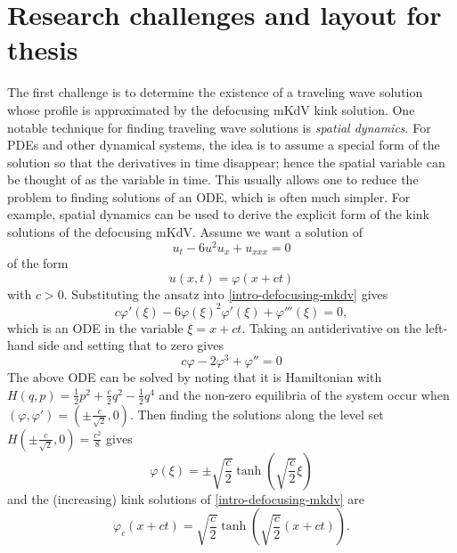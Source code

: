 \section{Research challenges and layout for thesis}

The first challenge is to determine the existence of a traveling wave solution whose profile is approximated by the defocusing mKdV kink solution. One notable technique for finding traveling wave solutions is \emph{spatial dynamics}. For PDEs and other dynamical systems, the idea is to assume a special form of the solution so that the derivatives in time disappear; hence the spatial variable can be thought of as the variable in time. This usually allows one to reduce the problem to finding solutions of an ODE, which is often much simpler. For example, spatial dynamics can be used to derive the explicit form of the kink solutions of the defocusing mKdV. Assume we want a solution of 
\begin{equation}\label{intro-defocusing-mkdv}
	u_t - 6u^2u_x + u_{xxx} = 0
\end{equation}
of the form
\begin{equation*}
	u(x,t) = \varphi(x+ct) 
\end{equation*}
with \(c > 0\). Substituting the ansatz into \cref{intro-defocusing-mkdv} gives
\begin{equation*}
	c \varphi '(\xi) - 6\varphi(\xi)^2 \varphi'(\xi) + \varphi'''(\xi) = 0,
\end{equation*}
which is an ODE in the variable \(\xi=x+ct\). Taking an antiderivative on the left-hand side and setting that to zero gives
\begin{equation*}
	c\varphi  - 2 \varphi^3  + \varphi'' = 0
\end{equation*}
The above ODE can be solved by noting that it is Hamiltonian with \(H(q,p) = \frac 1 2 p^2 + \frac c 2 q^2 - \frac 12 q^4\) and the non-zero equilibria of the system occur when \((\varphi, \varphi') = (\pm \frac c {\sqrt 2}, 0)\). Then finding the solutions along the level set \(H(\pm \frac c {\sqrt 2}, 0) = \frac {c^2} 8\) gives 
\begin{equation*}
	\varphi(\xi) = \pm \sqrt{\frac c  2} \tanh\left( \sqrt{\frac c 2} \xi\right)
\end{equation*}
and the (increasing) kink solutions of \cref{intro-defocusing-mkdv} are 
\begin{equation*}
	\varphi_c(x+ct) = \sqrt{\frac c 2} \tanh\left(\sqrt{\frac c 2} (x+ct) \right).
\end{equation*}

